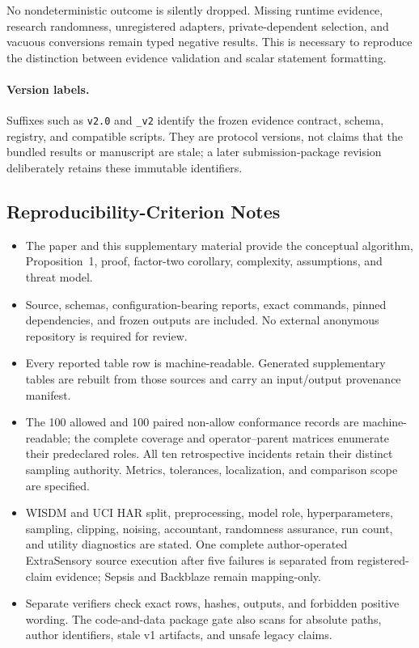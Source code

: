 \documentclass[letterpaper]{article} %
\begin{document}
No nondeterministic outcome is silently dropped.  Missing runtime evidence,
research randomness, unregistered adapters, private-dependent selection, and
vacuous conversions remain typed negative results.  This is necessary to
reproduce the distinction between evidence validation and scalar statement
formatting.

\paragraph{Version labels.}
Suffixes such as \texttt{v2.0} and \texttt{\_v2} identify the frozen evidence
contract, schema, registry, and compatible scripts.  They are protocol
versions, not claims that the bundled results or manuscript are stale; a later
submission-package revision deliberately retains these immutable identifiers.

\subsection{Reproducibility-Criterion Notes}

\begin{itemize}
\item The paper and this supplementary material provide the conceptual algorithm,
  Proposition~1, proof, factor-two corollary, complexity, assumptions, and
  threat model.
\item Source, schemas, configuration-bearing reports, exact commands, pinned
  dependencies, and frozen outputs are included.  No external anonymous
  repository is required for review.
\item Every reported table row is machine-readable.  Generated supplementary
  tables are rebuilt from those sources and carry an input/output provenance
  manifest.
\item The 100 allowed and 100 paired non-allow conformance records are
  machine-readable; the complete coverage and operator--parent matrices
  enumerate their predeclared roles.  All ten retrospective incidents retain
  their distinct sampling authority.  Metrics, tolerances, localization, and
  comparison scope are specified.
\item WISDM and UCI HAR split, preprocessing, model role, hyperparameters,
  sampling, clipping, noising, accountant, randomness assurance, run count,
  and utility diagnostics are stated.  One complete author-operated
  ExtraSensory source execution after five failures is separated from
  registered-claim evidence; Sepsis and Backblaze remain mapping-only.
\item Separate verifiers check exact rows, hashes, outputs, and forbidden
  positive wording.  The code-and-data package gate also scans for absolute
  paths, author identifiers, stale v1 artifacts, and unsafe legacy claims.
\end{itemize}
\end{document}
